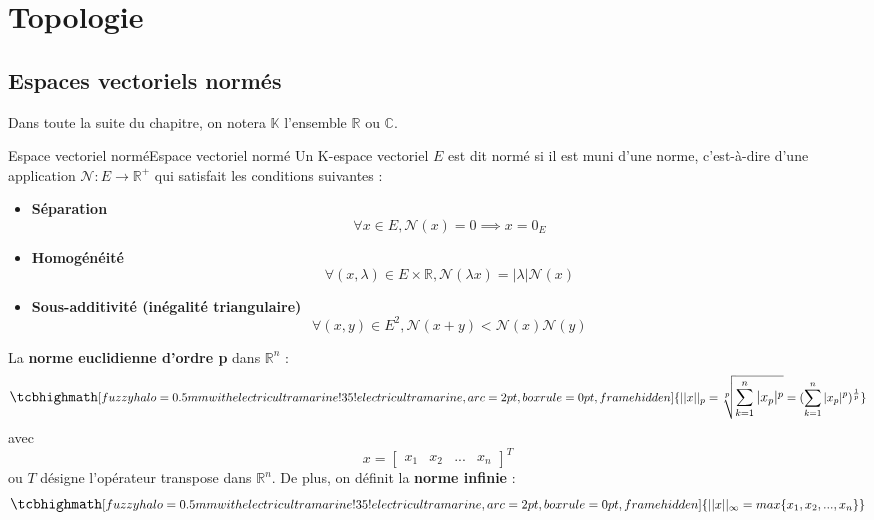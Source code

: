 \chapter{Topologie}
\section{Espaces vectoriels normés}
Dans toute la suite du chapitre, on notera $\mathbb{K}$ l'ensemble $\mathbb{R}$ ou $\mathbb{C}$.
\begin{definition}{Espace vectoriel normé}{Espace vectoriel normé}
    Un K-espace vectoriel $E$ est dit normé si il est muni d'une norme, c'est-à-dire d'une application $\mathcal{N} : E \rightarrow \mathbb{R}^{+}$ qui satisfait les conditions suivantes :
    \begin{itemize}
        \item \textbf{Séparation}
        \begin{equation}
            \forall x \in E, \mathcal{N}(x)=0 \implies x = 0_{E} \nonumber
        \end{equation} 
        \item \textbf{Homogénéité}
        \begin{equation}
            \forall (x,\lambda) \in E \times \mathbb{R}, \mathcal{N}(\lambda x) = |\lambda|\mathcal{N}(x) \nonumber
        \end{equation} 
        \item \textbf{Sous-additivité (inégalité triangulaire)}
        \begin{equation}
            \forall (x,y) \in E^{2}, \mathcal{N}(x+y) < \mathcal{N}(x)\mathcal{N}(y) \nonumber
        \end{equation} 
    \end{itemize}
\end{definition}
La \textbf{norme euclidienne d'ordre p} dans $\mathbb{R}^{n}$ :
\begin{equation}
    \large
    \tcbhighmath[fuzzy halo=0.5mm with electricultramarine!35!electricultramarine,arc=2pt,
    boxrule=0pt,frame hidden]{ 
        ||x||_{p} = \sqrt[p]{\sum_{k=1}^{n}|x_{p}|^{p}} = (\sum_{k=1}^{n}|x_{p}|^{p})^{\frac{1}{p}}
     }
    \normalsize
\end{equation}
avec 
\[ x = 
\begin{bmatrix}
    x_{1} & x_{2} & ... & x_{n}
\end{bmatrix}
^{T}
\]
ou $T$ désigne l'opérateur transpose dans $\mathbb{R}^{n}$. De plus, on définit la \textbf{norme infinie} :
\begin{equation}
    \large
    \tcbhighmath[fuzzy halo=0.5mm with electricultramarine!35!electricultramarine,arc=2pt,
    boxrule=0pt,frame hidden]{ 
        ||x||_{\infty} = max\{ x_{1}, x_{2}, ..., x_{n}\}
     }
    \normalsize
\end{equation}
\newpage
